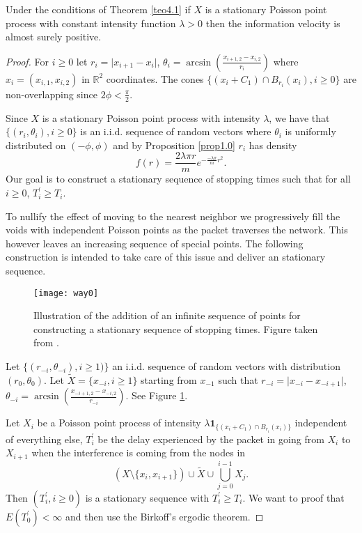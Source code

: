 \begin{thm}
Under the conditions of Theorem \ref{teo4.1} if $X$ is a stationary Poisson point process with constant intensity function $\lambda>0$ then the information velocity is almost surely positive. 
\end{thm}
\begin{proof}

For $i\geq 0$ let $r_{i}=\vert x_{i+1}-x_i\vert$, $\theta_{i}=\arcsin(\frac{x_{i+1,2}-x_{i,2}}{r_i})$ where\\ $x_i=(x_{i,1},x_{i,2})$ in $\mathbb{R}^2$	coordinates. The cones $\lbrace (x_i+C_1)\cap B_{r_i}(x_i),i\geq 0\rbrace$ are non-overlapping since $2\phi<\frac{\pi}{2}$. 

Since $X$ is a stationary Poisson point process with intensity $\lambda$, we have that $\lbrace (r_i,\theta_i),i\geq 0\rbrace$ is an i.i.d. sequence of random vectors where $\theta_i$ is uniformly distributed on $(-\phi,\phi)$ and by Proposition \ref{prop1.0} $r_i$ has density $$f(r)=\frac{2\lambda\pi r}{m}e^{-\frac{-\lambda\pi}{m}r^{2}}.$$ Our goal is to construct a stationary sequence of stopping times such that for all $i\geq 0$, $T^{'}_{i}\geq T_i$.



To nullify the effect of moving to the nearest neighbor we progressively fill the voids with independent Poisson points as the packet traverses the network. This however leaves an increasing sequence of special points. The following construction is intended to take care of this issue and deliver an stationary sequence.



\begin{figure}
\captionsetup{width=1\textwidth}
  \centering
    \texttt{[image: way0]}
  \caption{Illustration of the addition of an infinite sequence of points for constructing a stationary sequence of stopping times. Figure taken from \cite{Iye}.} \label{figway0}
\end{figure}

Let $\lbrace (r_{-i},\theta_{-i}),i\geq 1)\rbrace$ an i.i.d. sequence of random vectors with distribution $(r_0,\theta_0)$. Let $\widetilde{X}=\lbrace x_{-i},i\geq 1\rbrace$ starting from $x_{-1}$ such that $r_{-i}=\vert x_{-i}-x_{-i+1}\vert$, $\theta_{-i}=\arcsin(\frac{x_{-i+1,2}-x_{-i,2}}{r_{-i}}).$ See Figure \ref{figway0}.

Let $X_i$ be a Poisson point process of intensity $\lambda \textbf{1}_{\lbrace (x_i+C_1)\cap B_{r_i}(x_i)\rbrace}$ independent of everything else, $T_{i}^{'}$ be the delay experienced by the packet in going from $X_i$ to $X_{i+1}$ when the interference is coming from the nodes in $$(X\setminus\lbrace x_i,x_{i+1}\rbrace)\cup\widetilde{X}\cup\bigcup_{j=0}^{i-1}X_j.$$ Then $(T^{'}_{i},i\geq 0)$ is a stationary sequence with $T^{'}_i\geq T_{i}$. We want to proof that $E(T^{'}_0)<\infty$ and then use the Birkoff's ergodic theorem.


\end{proof}

